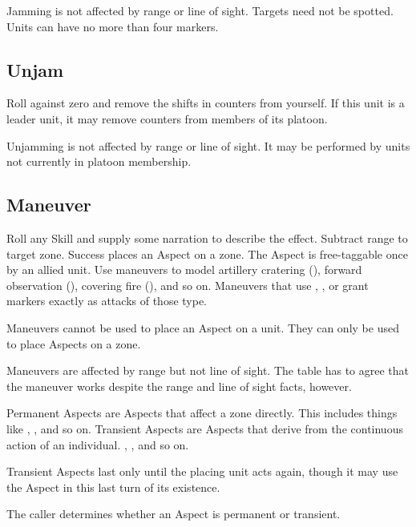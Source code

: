 Jamming is not affected by range or line of sight. Targets need not be spotted. Units can have no more than four \OOC{} markers.

\vfil
\subsection{Unjam}\label{sec:platoon-combat-unjam} %

Roll  against zero and remove the shifts in \OOC{} counters from yourself. If this unit is a leader unit, it may remove \OOC{} counters from members of its platoon.

Unjamming is not affected by range or line of sight. It may be performed by units not currently in platoon membership.

\subsection{Maneuver}\label{sec:platoon-combat-maneuver}

Roll any Skill and supply some narration to describe the effect. Subtract range to target zone. Success places an Aspect on a zone. The Aspect is free-taggable once by an allied unit. Use maneuvers to model artillery cratering (), forward observation (), covering fire (), and so on. Maneuvers that use , , or  grant \SPOTTED{} markers exactly as attacks of those type.

Maneuvers cannot be used to place an Aspect on a unit. They can only be used to place Aspects on a zone.

Maneuvers are affected by range but not line of sight. The table has to agree that the maneuver works despite the range and line of sight facts, however.

Permanent Aspects are Aspects that affect a zone directly. This includes things like , , and so on. Transient Aspects are Aspects that derive from the continuous action of an individual. , , and so on.

Transient Aspects last only until the placing unit acts again, though it may use the Aspect in this last turn of its existence.

The caller determines whether an Aspect is permanent or transient.

\vfil
